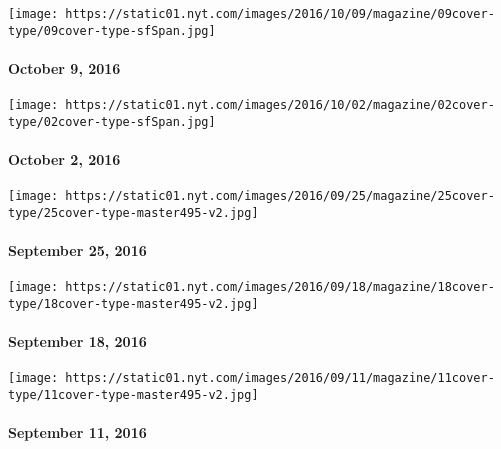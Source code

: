 \href{http://www.nytimes.com/indexes/2016/10/09/magazine/index.html}{}

\texttt{[image: https://static01.nyt.com/images/2016/10/09/magazine/09cover-type/09cover-type-sfSpan.jpg]}

\hypertarget{october-9-2016}{%
\paragraph{October 9, 2016}\label{october-9-2016}}

\href{http://www.nytimes.com/indexes/2016/10/02/magazine/index.html}{}

\texttt{[image: https://static01.nyt.com/images/2016/10/02/magazine/02cover-type/02cover-type-sfSpan.jpg]}

\hypertarget{october-2-2016}{%
\paragraph{October 2, 2016}\label{october-2-2016}}

\href{http://www.nytimes.com/indexes/2016/09/25/magazine/index.html}{}

\texttt{[image: https://static01.nyt.com/images/2016/09/25/magazine/25cover-type/25cover-type-master495-v2.jpg]}

\hypertarget{september-25-2016}{%
\paragraph{September 25, 2016}\label{september-25-2016}}

\href{http://www.nytimes.com/indexes/2016/09/18/magazine/index.html}{}

\texttt{[image: https://static01.nyt.com/images/2016/09/18/magazine/18cover-type/18cover-type-master495-v2.jpg]}

\hypertarget{september-18-2016}{%
\paragraph{September 18, 2016}\label{september-18-2016}}

\href{http://www.nytimes.com/indexes/2016/09/11/magazine/index.html}{}

\texttt{[image: https://static01.nyt.com/images/2016/09/11/magazine/11cover-type/11cover-type-master495-v2.jpg]}

\hypertarget{september-11-2016}{%
\paragraph{September 11, 2016}\label{september-11-2016}}

